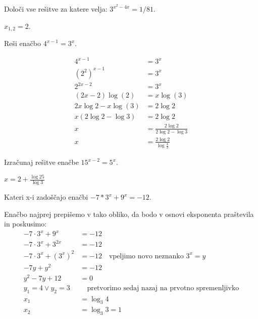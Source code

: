 \begin{vaja}
	Določi vse rešitve za katere velja: \(3^{x^2-4x}=1/81\).
  \begin{odgovor}$x_{1,2}=2$.
  \end{odgovor}
\end{vaja}


\begin{vaja}
  Reši enačbo $4^{x-1}=3^x$.

  \begin{odgovor}
	\begin{align*}
	 4^{x-1}&=3^x\\
	 (2^2)^{x-1}&=3^x\\
	 2^{2x-2}&=3^x\\
	 (2x-2)\log(2)&=x\log(3)\\
	 2x\log2-x\log(3)&=2\log2\\
	 x(2\log2-\log3)&=2\log2\\
	 x&=\frac{2\log2}{2\log2-\log3}\\
	 x&=\frac{2\log2}{\log{\frac{4}{3}}}
	\end{align*}    
  \end{odgovor}
\end{vaja}

\begin{vaja}
	Izračunaj rešitve enačbe \( 15^{x-2}=5^x\).
  \begin{odgovor}
   	$x=2+\frac{\log25}{\log3}$
  \end{odgovor}
\end{vaja}

\begin{vaja}
	Kateri x-i zadoščajo enačbi \(-7*3^x+9^x=-12\).
  \begin{odgovor}
   	Enačbo najprej prepišemo v tako obliko, da bodo v osnovi eksponenta praštevila in poskusimo:
	\begin{align*}
	-7 \cdot 3^x+9^x&=-12\\
	-7\cdot 3^x+3^{2x}&=-12\\
	-7\cdot 3^x+(3^x)^2&=-12\quad \text{vpeljimo novo neznanko } 3^x=y\\
	-7y+y^2&=-12\\
	y^2-7y+12&=0\\
	y_{1}=4 \lor y_{2}=3 & \quad \text{pretvorimo sedaj nazaj na prvotno spremenljivko}\\
	x_{1}&=\log_{3}{4}\\
	x_{2}&=\log_{3}{3}=1
	\end{align*}
  \end{odgovor}
\end{vaja}

